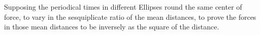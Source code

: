 Supposing the periodical times in different
Ellipses round the same center of force, to
vary in the sesquiplicate ratio of the mean
distances, to prove the forces in those mean 
distances to be inversely as the square of 
the distance.
